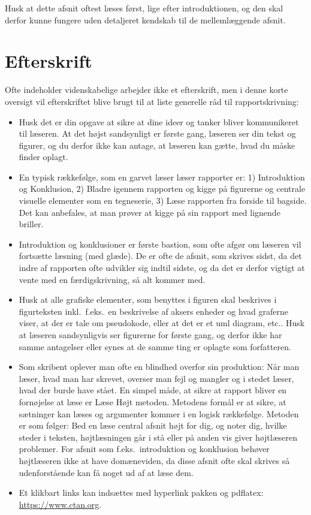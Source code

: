 \documentclass[a4paper]{article}
\begin{document}
Husk at dette afsnit oftest læses først, lige efter introduktionen, og den skal derfor kunne fungere uden detaljeret kendskab til de mellemlæggende afsnit.

\section{Efterskrift}
Ofte indeholder videnskabelige arbejder ikke et efterskrift, men i denne korte oversigt vil efterskriftet blive brugt til at liste generelle råd til rapportskrivning:
\begin{itemize}
\item Husk det er din opgave at sikre at dine ideer og tanker bliver kommunikeret til læseren. At det højst sandsynligt er første gang, læseren ser din tekst og figurer, og du derfor ikke kan antage, at læseren kan gætte, hvad du måske finder oplagt.
\item En typisk rækkefølge, som en garvet læser læser rapporter er: 1) Introduktion og Konklusion, 2) Bladre igennem rapporten og kigge på figurerne og centrale visuelle elementer som en tegneserie, 3) Læse rapporten fra forside til bagside. Det kan anbefales, at man prøver at kigge på sin rapport med lignende briller.
\item Introduktion og konklusioner er første bastion, som ofte afgør om læseren vil fortsætte læsning (med glæde). De er ofte de afsnit, som skrives sidst, da det indre af rapporten ofte udvikler sig indtil sidste, og da det er derfor vigtigt at vente med en færdigskrivning, så alt kommer med.
\item Husk at alle grafiske elementer, som benyttes i figuren skal beskrives i figurteksten inkl.\ f.eks.\ en beskrivelse af aksers enheder og hvad graferne viser, at der er tale om pseudokode, eller at det er et uml diagram, etc.. Husk at læseren sandsynligvis ser figurerne for første gang, og derfor ikke har samme antagelser eller synes at de samme ting er oplagte som forfatteren.
\item Som skribent oplever man ofte en blindhed overfor sin produktion: Når man læser, hvad man har skrevet, overser man fejl og mangler og i stedet læser, hvad der burde have stået. En simpel måde, at sikre at rapport bliver en fornøjelse at læse er Læse Højt metoden. Metodens formål er at sikre, at sætninger kan læses og argumenter kommer i en logisk rækkefølge.  Metoden er som følger: Bed en læse central afsnit højt for dig, og noter dig, hvilke steder i teksten, højtlæsningen går i stå eller på anden vis giver højtlæseren problemer. For afsnit som f.eks.\ introduktion og konklusion behøver højtlæseren ikke at have domæneviden, da disse afsnit ofte skal skrives så udenforstående kan få noget ud af at læse dem.
\item Et klikbart links kan indsættes med hyperlink pakken og pdflatex: \url{https://www.ctan.org}.
\end{itemize}
\end{document}

